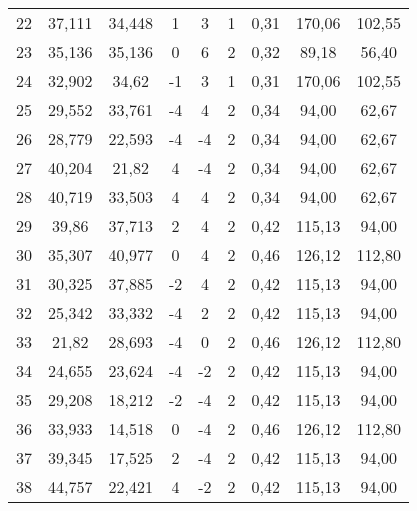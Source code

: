 \begin{table}[h]
\begin{tabular}{ccccccccc}
22 & 37,111 & 34,448 & 1 & 3 & 1 & 0,31 & 170,06 & 102,55\\
23 & 35,136 & 35,136 & 0 & 6 & 2 & 0,32 & 89,18 & 56,40\\
24 & 32,902 & 34,62 & -1 & 3 & 1 & 0,31 & 170,06 & 102,55\\
25 & 29,552 & 33,761 & -4 & 4 & 2 & 0,34 & 94,00 & 62,67\\
26 & 28,779 & 22,593 & -4 & -4 & 2 & 0,34 & 94,00 & 62,67\\
27 & 40,204 & 21,82 & 4 & -4 & 2 & 0,34 & 94,00 & 62,67\\
28 & 40,719 & 33,503 & 4 & 4 & 2 & 0,34 & 94,00 & 62,67\\
29 & 39,86 & 37,713 & 2 & 4 & 2 & 0,42 & 115,13 & 94,00\\
30 & 35,307 & 40,977 & 0 & 4 & 2 & 0,46 & 126,12 & 112,80\\
31 & 30,325 & 37,885 & -2 & 4 & 2 & 0,42 & 115,13 & 94,00\\
32 & 25,342 & 33,332 & -4 & 2 & 2 & 0,42 & 115,13 & 94,00\\
33 & 21,82 & 28,693 & -4 & 0 & 2 & 0,46 & 126,12 & 112,80\\
34 & 24,655 & 23,624 & -4 & -2 & 2 & 0,42 & 115,13 & 94,00\\
35 & 29,208 & 18,212 & -2 & -4 & 2 & 0,42 & 115,13 & 94,00\\
36 & 33,933 & 14,518 & 0 & -4 & 2 & 0,46 & 126,12 & 112,80\\
37 & 39,345 & 17,525 & 2 & -4 & 2 & 0,42 & 115,13 & 94,00\\
38 & 44,757 & 22,421 & 4 & -2 & 2 & 0,42 & 115,13 & 94,00\\
\bottomrule
\end{tabular}
\end{table}
